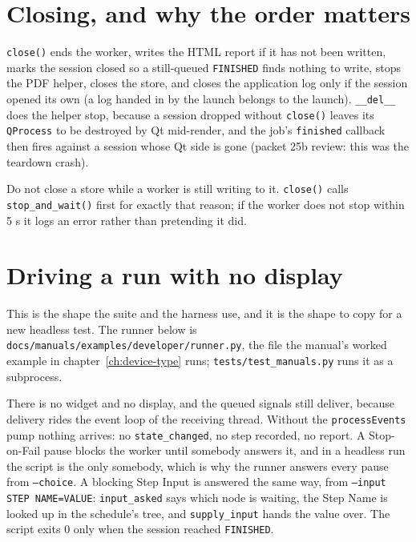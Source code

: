 \section{Closing, and why the order matters}

\texttt{close()} ends the worker, writes the HTML report if it has not been written, marks the session
closed so a still-queued \texttt{FINISHED} finds nothing to write, stops the PDF helper, closes the
store, and closes the application log only if the session opened its own (a log handed in by the launch
belongs to the launch). \texttt{\_\_del\_\_} does the helper stop, because a session dropped without
\texttt{close()} leaves its \texttt{QProcess} to be destroyed by Qt mid-render, and the job's
\texttt{finished} callback then fires against a session whose Qt side is gone (packet 25b review: this
was the teardown crash).

Do not close a store while a worker is still writing to it. \texttt{close()} calls
\texttt{stop\_and\_wait()} first for exactly that reason; if the worker does not stop within 5 s it logs
an error rather than pretending it did.

\section{Driving a run with no display}

This is the shape the suite and the harness use, and it is the shape to copy for a new headless test.
The runner below is \texttt{docs/manuals/examples/developer/runner.py}, the file the manual's worked
example in chapter~\ref{ch:device-type} runs; \texttt{tests/test\_manuals.py} runs it as a subprocess.



There is no widget and no display, and the queued signals still deliver, because delivery rides the
event loop of the receiving thread. Without the \texttt{processEvents} pump nothing arrives: no
\texttt{state\_changed}, no step recorded, no report. A Stop-on-Fail pause blocks the worker until
somebody answers it, and in a headless run the script is the only somebody, which is why the runner
answers every pause from \texttt{--choice}. A blocking Step Input is answered the same way, from
\texttt{--input STEP NAME=VALUE}: \texttt{input\_asked} says which node is waiting, the Step Name is
looked up in the schedule's tree, and \texttt{supply\_input} hands the value over. The script exits
0 only when the session reached \texttt{FINISHED}.

